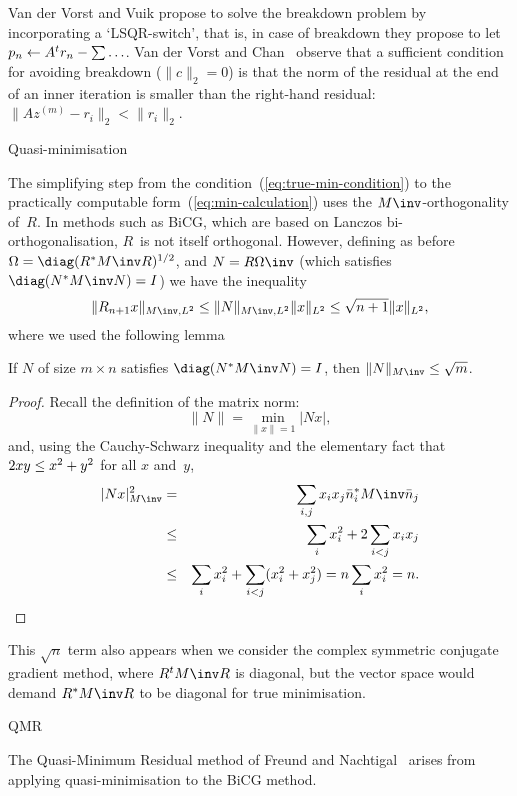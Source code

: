 \documentclass[11pt]{artikel3}
\begin{document}
\begin{Outline}
Van der Vorst and Vuik propose to solve the breakdown problem by
incorporating a `LSQR-switch', that is, in case of breakdown they
propose to let~$p_n\leftarrow\nobreak A^tr_n-\sum\ldots$. Van der
Vorst and Chan~\cite{VorstChan:iterative} observe that a sufficient
condition for avoiding breakdown ($\|c\|_2=0$) is that the norm of the
residual at the end of an inner iteration is smaller than the
right-hand residual: $\|Az^{(m)}-r_i\|_2<\|r_i\|_2$.

 {Quasi-minimisation}\label{sec:quasi-min}

The simplifying step from the condition~(\ref{eq:true-min-condition})
to the practically computable form~(\ref{eq:min-calculation})
uses the $M\inv$-orthogonality of~$R$.
In methods such as BiCG, which are based on Lanczos bi-orthogonalisation,
$R$~is not itself orthogonal.
However, defining as before $\Omega=\diag(R^*M\inv R)^{1/2}$, and
$N=R\Omega\inv$ (which satisfies $\diag(N^*M\inv N)=\nobreak I$) 
we have the inequality
\[ \|R_{n+1}x\|_{M\inv,L^2} \leq \|N\|_{M\inv,L^2}\|x\|_{L^2}
    \leq \sqrt{n+1}\|x\|_{L^2}, \]
where we used the following lemma
\begin{lemma}
If $N$ of size $m\times n$ satisfies $\diag(N^*M\inv N)=I$,
then $\|N\|_{M\inv}\leq\sqrt m$.
\end{lemma}
\begin{proof}
Recall the definition of the matrix norm:
\[ \|N\|=\min_{\|x\|=1}|Nx|, \]
and, using the Cauchy-Schwarz inequality and the elementary
fact that $2xy\leq\nobreak x^2+\nobreak y^2$ for all $x$ and~$y$,
\begin{eqnarray*}
    |Nx|_{M\inv}^2 &=& \sum_{i,j}x_ix_j\bar n_i^*M\inv \bar n_j \\
    &\leq& \sum_i x_i^2+2\sum_{i<j}x_ix_j \\
    &\leq& \sum_i x_i^2 +\sum_{i<j}(x_i^2+x_j^2) = n\sum_ix_i^2 = n.
\end{eqnarray*}
\end{proof}

This $\sqrt{n}$ term also appears when we consider the complex symmetric
conjugate gradient method, where $R^tM\inv R$ is diagonal, but the
vector space would demand $R^*M\inv R$ to be diagonal for
true minimisation.

 {QMR}
\label{sec:qmr}

The Quasi-Minimum Residual method of Freund and Nachtigal~\cite{FrNa:qmr}
arises from applying quasi-minimisation to the BiCG method.



\end{Outline}
\end{document}
